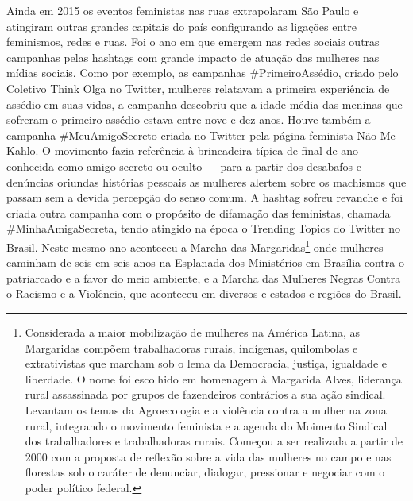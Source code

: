 Ainda em 2015 os eventos feministas nas ruas extrapolaram São Paulo e
atingiram outras grandes capitais do país configurando as ligações entre
feminismos, redes e ruas. Foi o ano em que emergem nas redes sociais
outras campanhas pelas hashtags com grande impacto de atuação das
mulheres nas mídias sociais. Como por exemplo, as campanhas \#PrimeiroAssédio, 
criado pelo Coletivo Think Olga no Twitter, mulheres relatavam
a primeira experiência de assédio em suas vidas, a campanha descobriu
que a idade média das meninas que sofreram o primeiro assédio estava
entre nove e dez anos. Houve também a campanha \#MeuAmigoSecreto criada
no Twitter pela página feminista Não Me Kahlo. O movimento fazia
referência à brincadeira típica de final de ano --- conhecida como amigo
secreto ou oculto --- para a partir dos desabafos e denúncias oriundas
histórias pessoais as mulheres alertem sobre os machismos que passam sem
a devida percepção do senso comum. A hashtag sofreu revanche e foi
criada outra campanha com o propósito de difamação das feministas,
chamada \#MinhaAmigaSecreta, tendo atingido na época o Trending Topics
do Twitter no Brasil. Neste mesmo ano aconteceu a Marcha das
Margaridas\footnote{Considerada a maior mobilização de mulheres na
  América Latina, as Margaridas compõem trabalhadoras rurais, indígenas,
  quilombolas e extrativistas que marcham sob o lema da Democracia,
  justiça, igualdade e liberdade. O nome foi escolhido em homenagem à
  Margarida Alves, liderança rural assassinada por grupos de fazendeiros
  contrários a sua ação sindical. Levantam os temas da Agroecologia e a
  violência contra a mulher na zona rural, integrando o movimento
  feminista e a agenda do Moimento Sindical dos trabalhadores e
  trabalhadoras rurais. Começou a ser realizada a partir de 2000 com a
  proposta de reflexão sobre a vida das mulheres no campo e nas
  florestas sob o caráter de denunciar, dialogar, pressionar e negociar
  com o poder político federal.} onde mulheres caminham de seis em seis anos na
Esplanada dos Ministérios em Brasília contra o patriarcado e a favor do
meio ambiente, e a Marcha das Mulheres Negras Contra o Racismo e a
Violência, que aconteceu em diversos e estados e regiões do Brasil.

